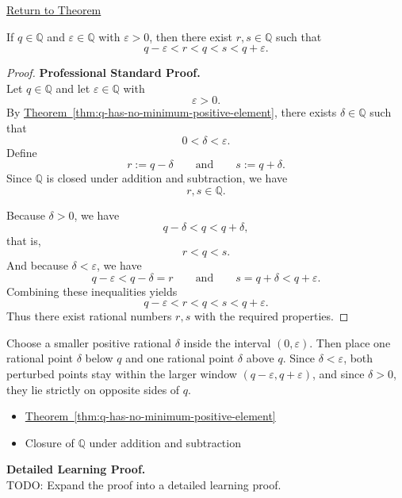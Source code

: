 \newpage
{}
\label{prf:rational-upper-lower-perturbation}

\begin{remark*}[Return]
\hyperref[lem:rational-upper-lower-perturbation]{Return to Theorem}
\end{remark*}

\begin{theorem*}
If $q\in\mathbb{Q}$ and $\varepsilon\in\mathbb{Q}$ with $\varepsilon>0$, then there exist $r,s\in\mathbb{Q}$
such that
\[
q-\varepsilon < r < q < s < q+\varepsilon.
\]
\end{theorem*}

\begin{proof}
\textbf{Professional Standard Proof.}~\\
Let $q\in\mathbb{Q}$ and let $\varepsilon\in\mathbb{Q}$ with
\[
\varepsilon>0.
\]
By
\hyperref[thm:q-has-no-minimum-positive-element]{Theorem~\ref*{thm:q-has-no-minimum-positive-element}},
there exists $\delta\in\mathbb{Q}$ such that
\[
0<\delta<\varepsilon.
\]
Define
\[
r:=q-\delta
\qquad\text{and}\qquad
s:=q+\delta.
\]
Since $\mathbb{Q}$ is closed under addition and subtraction, we have
\[
r,s\in\mathbb{Q}.
\]

Because $\delta>0$, we have
\[
q-\delta<q<q+\delta,
\]
that is,
\[
r<q<s.
\]
And because $\delta<\varepsilon$, we have
\[
q-\varepsilon<q-\delta=r
\qquad\text{and}\qquad
s=q+\delta<q+\varepsilon.
\]
Combining these inequalities yields
\[
q-\varepsilon<r<q<s<q+\varepsilon.
\]
Thus there exist rational numbers $r,s$ with the required properties.
\end{proof}

\begin{remark*}
Choose a smaller positive rational $\delta$ inside the interval $(0,\varepsilon)$.
Then place one rational point $\delta$ below $q$ and one rational point
$\delta$ above $q$.  Since $\delta<\varepsilon$, both perturbed points stay
within the larger window $(q-\varepsilon,q+\varepsilon)$, and since
$\delta>0$, they lie strictly on opposite sides of $q$.
\end{remark*}

\begin{dependencies}
\begin{itemize}
  \item \hyperref[thm:q-has-no-minimum-positive-element]{Theorem~\ref*{thm:q-has-no-minimum-positive-element}}
  \item Closure of $\mathbb{Q}$ under addition and subtraction
\end{itemize}
\end{dependencies}

\textbf{Detailed Learning Proof.}~\\
TODO: Expand the proof into a detailed learning proof.

